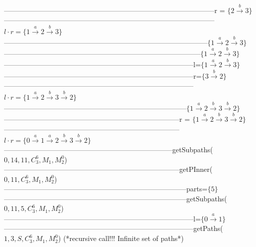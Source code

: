 {------------------------------------------------------------------------------------------r = $\{2 \xrightarrow{b} 3\}$\\
------------------------------------------------------------------------------------------$l\cdot r = \{1 \xrightarrow{a} 2 \xrightarrow{b} 3\}$\\ 
---------------------------------------------------------------------------------------$\{1 \xrightarrow{a} 2 \xrightarrow{b} 3\}$\\
------------------------------------------------------------------------------------$\{1 \xrightarrow{a} 2 \xrightarrow{b} 3\}$\\
---------------------------------------------------------------------------------l=$\{1 \xrightarrow{a} 2 \xrightarrow{b} 3\}$\\
---------------------------------------------------------------------------------r=$\{3 \xrightarrow{b} 2\}$\\
---------------------------------------------------------------------------------$l \cdot r = \{1 \xrightarrow{a} 2 \xrightarrow{b} 3 \xrightarrow{b} 2\}$\\
------------------------------------------------------------------------------$\{1 \xrightarrow{a} 2 \xrightarrow{b} 3 \xrightarrow{b} 2\}$\\
---------------------------------------------------------------------------r = $\{1 \xrightarrow{a} 2 \xrightarrow{b} 3 \xrightarrow{b} 2\}$\\
---------------------------------------------------------------------------$l \cdot r = \{0 \xrightarrow{a} 1 \xrightarrow{a} 2 \xrightarrow{b} 3 \xrightarrow{b} 2\}$\\
------------------------------------------------------------------------getSubpaths($0,14,11,C_3^6,M_1,M_2^0$)\\
---------------------------------------------------------------------------getPInner($0,11,C_3^6,M_1,M_2^0$)\\
------------------------------------------------------------------------------parts=$\{5\}$\\
------------------------------------------------------------------------------getSubpaths($0,11,5,C_3^6,M_1,M_2^0$)\\
---------------------------------------------------------------------------------l=$\{0 \xrightarrow{a} 1\}$\\
---------------------------------------------------------------------------------getPaths($1,3,S,C_3^6,M_1,M_2^0$) (*recursive call!!! Infinite set of paths*)\\
}
